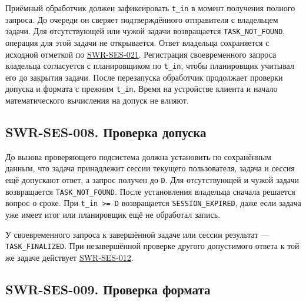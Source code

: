 \documentclass[12pt,a4paper]{article}
\begin{document}
\hypertarget{swr-ses-007-регистрация-времени-поступления}{}

\hypertarget{swr-ses-007}{}

Приёмный обработчик должен зафиксировать \texttt{t\_in} в момент получения полного запроса. До очереди он сверяет подтверждённого отправителя с владельцем задачи. Для отсутствующей или чужой задачи возвращается \texttt{TASK\_\allowbreak{}NOT\_\allowbreak{}FOUND}, операция для этой задачи не открывается. Ответ владельца сохраняется с исходной отметкой по {\hyperlink{swr-ses-021}{SWR-SES-021}}. Регистрация своевременного запроса владельца согласуется с планировщиком по \texttt{t\_in}, чтобы планировщик учитывал его до закрытия задачи. После перезапуска обработчик продолжает проверки допуска и формата с прежним \texttt{t\_in}. Время на устройстве клиента и начало математического вычисления на допуск не влияют.

\subsection{SWR-SES-008. Проверка допуска}\label{swr-ses-008-ux43fux440ux43eux432ux435ux440ux43aux430-ux434ux43eux43fux443ux441ux43aux430}

\hypertarget{swr-ses-008-проверка-допуска}{}

\hypertarget{swr-ses-008}{}

До вызова проверяющего подсистема должна установить по сохранённым данным, что задача принадлежит сессии текущего пользователя, задача и сессия ещё допускают ответ, а запрос получен до \texttt{D}. Для отсутствующей и чужой задачи возвращается \texttt{TASK\_\allowbreak{}NOT\_\allowbreak{}FOUND}. После установления владельца сначала решается вопрос о сроке. При \texttt{t\_in\ \textgreater{}=\ D} возвращается \texttt{SESSION\_\allowbreak{}EXPIRED}, даже если задача уже имеет итог или планировщик ещё не обработал запись.

У своевременного запроса к завершённой задаче или сессии результат --- \texttt{TASK\_\allowbreak{}FINALIZED}. При незавершённой проверке другого допустимого ответа к той же задаче действует {\hyperlink{swr-ses-012}{SWR-SES-012}}.

\subsection{SWR-SES-009. Проверка формата}\label{swr-ses-009-ux43fux440ux43eux432ux435ux440ux43aux430-ux444ux43eux440ux43cux430ux442ux430}

\hypertarget{swr-ses-009-проверка-формата}{}
\end{document}
